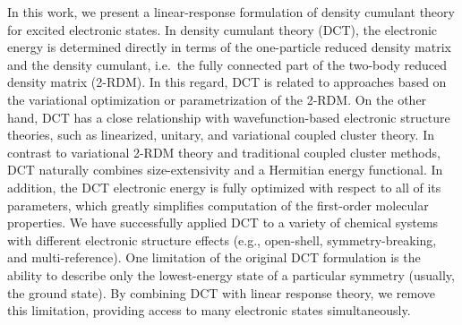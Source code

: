 In this work, we present a linear-response formulation of density cumulant
theory for excited electronic states.
In density cumulant theory (DCT),
\cite{Kutzelnigg:2006p171101,Simmonett:2010p174122,Sokolov:2012p054105,Sokolov:2013p024107,Sokolov:2013p204110,Sokolov:2014p074111,Wang:2016p4833,DCFTfootnote}
the electronic energy is determined directly in terms of the one-particle
reduced density matrix and the density
cumulant, i.e.~the fully connected part of the two-body reduced density matrix
(2-RDM).
\cite{Fulde:1991,Ziesche:1992p597,Kutzelnigg:1997p432,Mazziotti:1998p419,Mazziotti:1998p4219,Kutzelnigg:1999p2800,Ziesche:2000p33,Herbert:2007p261,Kong:2011p214109,Hanauer:2012p50}
In this regard, DCT is related to approaches based on the variational
optimization
\cite{Colmenero:1993p979,Nakatsuji:1996p1039,Mazziotti:1998p4219,Mazziotti:2006p143002,Kollmar:2006p084108,DePrince:2007p042501,DePrince:2016p164109}
or parametrization
\cite{Mazziotti:2008p253002,Mazziotti:2010p062515,DePrince:2012p1917} of the
2-RDM\@.
On the other hand, DCT has a close relationship with wavefunction-based
electronic structure theories, 
\cite{Sokolov:2013p024107,Sokolov:2013p204110}
such as linearized, unitary, and variational coupled
cluster theory.
\cite{Kutzelnigg:1991p349,Kutzelnigg:1998p65,VanVoorhis:2000p8873,Kutzelnigg:1982p3081,Bartlett:1989p133,Watts:1989p359,Szalay:1995p281,Cooper:2010p234102,Evangelista:2011p224102}
In contrast to variational 2-RDM theory
\cite{Nakata:2009p042109,vanAggelen:2010p114112,Verstichel:2010p114113}
and traditional
coupled cluster methods,\cite{Crawford:2000p33,Shavitt:2009}
DCT naturally combines
size-extensivity and a Hermitian energy functional. 
In addition, the DCT
electronic energy is fully optimized with respect to all of its parameters, which
greatly simplifies computation of the first-order molecular properties.
\cite{Scheiner:1987p5361,Salter:1989p1752,Gauss:1991p2623,Gauss:1991p207}
We have successfully applied DCT to a variety of chemical systems with
different electronic structure effects (e.g., open-shell, symmetry-breaking,
and multi-reference).
\cite{Sokolov:2013p204110,Sokolov:2014p074111,Wang:2016p4833,Copan:2014p2389,Mullinax:2015p2487}
One limitation of the original DCT formulation is
the ability to describe only the lowest-energy state of a
particular symmetry (usually, the ground state). By combining DCT with linear
response theory, we remove this limitation, providing access to many electronic
states simultaneously.

